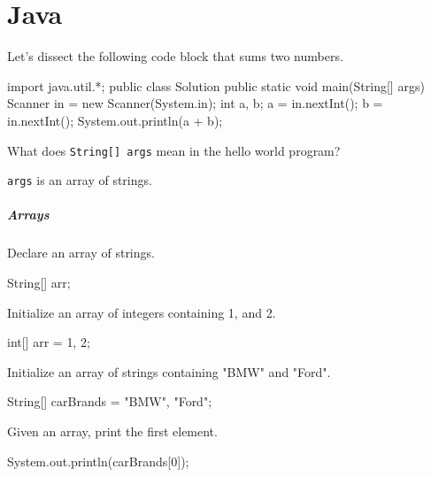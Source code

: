 \chapter{Java}

Let's dissect the following code block that sums two numbers.

\begin{java}
import java.util.*;
public class Solution {
    public static void main(String[] args) {
        Scanner in = new Scanner(System.in);
        int a, b;
        a = in.nextInt();
        b = in.nextInt();
        System.out.println(a + b);
    }
}
\end{java}

\begin{quest}
\item
	What does \texttt{String[] args} mean in the hello world program?

\begin{ans} \texttt{args} is an array of strings. \end{ans}
\end{quest}

\paragraph*{Arrays}
\begin{quest}
\item Declare an array of strings.
\begin{ans}
\begin{java}
String[] arr;
\end{java}
\end{ans}

\item Initialize an array of integers containing 1, and 2.
\begin{ans}
\begin{java}
int[] arr = {1, 2};
\end{java}
\end{ans}

\item Initialize an array of strings containing "BMW" and "Ford".

\begin{ans}
\begin{java}
String[] carBrands = {"BMW", "Ford"};
\end{java}
\end{ans}

\item Given an array,
print the first element.

\begin{ans}
\begin{java}
System.out.println(carBrands[0]);
\end{java}
\end{ans}
\end{quest}


